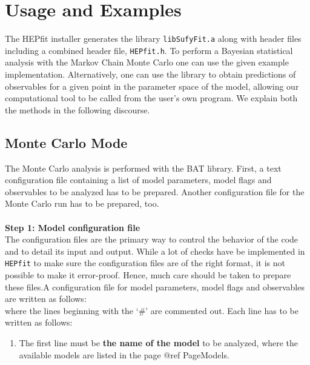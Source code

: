\documentclass[preprint,3p,12pt]{elsarticle}
\newcommand{\HEPfit}{\texttt{HEPfit}\xspace}
\begin{document}
{%
\section{Usage and Examples}
\label{sec:Usage}
The HEPfit installer generates the 
library \texttt{libSufyFit.a} along with header files including a combined
header file, \texttt{HEPfit.h}. To perform a Bayesian statistical analysis with the
Markov Chain Monte Carlo one can use the given example implementation.
Alternatively, one can use the library to obtain predictions
of observables for a given point in the parameter space of the model, 
allowing our computational tool to be called from the user's own program. We explain both the methods in the following discourse. 

\subsection{Monte Carlo Mode}
\label{sec:MC}

The Monte Carlo analysis is performed with the BAT library. First,
a text configuration file containing a list of model parameters,
model flags and observables to be analyzed has to be prepared. Another configuration
file for the Monte Carlo run has to be prepared, too.\\\\
%
{\bf \large Step 1: Model configuration file}\\


The configuration files are the primary way to control the behavior of the code and to detail its input and output. While a lot of checks have be implemented in \HEPfit to make sure the configuration files are of the right format, it is not possible to make it error-proof. Hence, much care should be taken to prepare these files.A configuration file for model parameters, model flags and
observables are written as follows:\\


where the lines beginning with the `\#' are commented out. Each line has to be written as follows: 

\begin{enumerate}
\item The first line must be {\bf the name of the model} to be analyzed,
   where the available models are listed in the page @ref PageModels.
  

\end{enumerate}}
\end{document}
